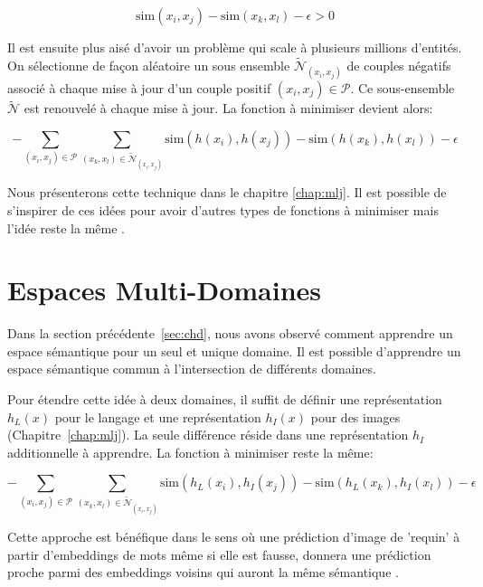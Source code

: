\begin{equation}
\textrm{sim}(x_i, x_j) - \textrm{sim}(x_k, x_l) - \epsilon > 0
\end{equation}

Il est ensuite plus aisé d'avoir un problème qui scale à plusieurs millions
d'entités. On sélectionne de façon aléatoire un sous ensemble
$\tilde{\mathcal{N}}_{(x_i, x_j)}$ de couples négatifs associé à chaque mise à jour
d'un couple positif $(x_i, x_j)\in\mathcal{P}$.  Ce sous-ensemble
$\tilde{\mathcal{N}}$ est renouvelé à chaque mise à jour. La fonction à minimiser
devient alors:  

\begin{equation}
-\sum_{(x_i, x_j)\in\mathcal{P}}\sum_{(x_k, x_l)\in\tilde{\mathcal{N}}_{(x_i, x_j)}} \textrm{sim}(h(x_i), h(x_j)) - \textrm{sim}(h(x_k), h(x_l)) - \epsilon
\label{eq:min-sim}
\end{equation}

Nous présenterons cette technique \citep{image-wsabie} dans le chapitre
\ref{chap:mlj}. Il est possible de s'inspirer de ces idées pour avoir d'autres
types de fonctions à minimiser mais l'idée reste la même \citep{rnn58}.

\section{Espaces Multi-Domaines}

Dans la section précédente~\ref{sec:chd}, nous avons observé comment apprendre un espace
sémantique pour un seul et unique domaine. Il est possible d'apprendre un espace
sémantique commun à l'intersection de différents domaines.  

Pour étendre cette idée à deux domaines, il suffit de définir une
représentation $h_L(x)$ pour le langage et une représentation $h_I(x)$ pour des images
(Chapitre~\ref{chap:mlj}). La seule différence réside dans une
représentation $h_I$ additionnelle à apprendre. La fonction à minimiser
reste la même:

 \begin{equation}
-\sum_{(x_i, x_j)\in\mathcal{P}}\sum_{(x_k, x_l)\in\tilde{\mathcal{N}}_{(x_i, x_j)}} \textrm{sim}(h_L(x_i), h_I(x_j)) - \textrm{sim}(h_L(x_k), h_I(x_l)) - \epsilon
\end{equation}

Cette approche est bénéfique dans le sens où une prédiction d'image de
'requin' à partir d'embeddings de mots même si elle est fausse, donnera une
prédiction proche parmi des embeddings voisins qui auront la même sémantique \citep{samy-extreme}.

